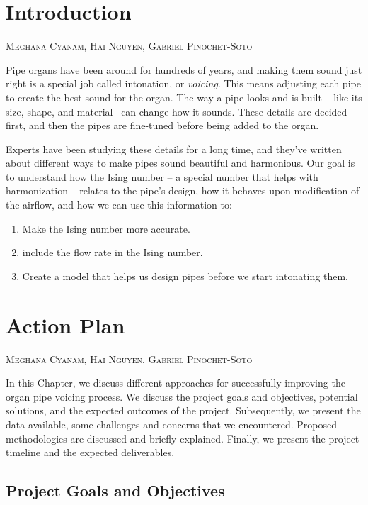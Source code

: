 \documentclass{psu-report}
\newcommand{\chapterauthor}[1]{%
  \vspace{-2em}
  {\large \textsc{#1}\par}
  \vspace{1.5em}
}
\begin{document}

\startbody

\chapter{Introduction}
\chapterauthor{Meghana Cyanam, Hai Nguyen, Gabriel Pinochet-Soto}

Pipe organs have been around for hundreds of years, and making them sound just
right is a special job called intonation, or \emph{voicing}.
This means adjusting each pipe to create the best sound for the organ.
The way a pipe looks and is built -- like its size, shape, and material-- can
change how it sounds.
These details are decided first, and then the pipes are fine-tuned before being
added to the organ.

Experts have been studying these details for a long time, and they’ve written
about different ways to make pipes sound beautiful and harmonious.
Our goal is to understand how the Ising number -- a special number that helps
with harmonization -- relates to the pipe’s design, how it behaves upon modification of
the airflow, and how we can use this information to:
\begin{enumerate}
    \item Make the Ising number more accurate.
    \item include the flow rate in the Ising number.
    \item Create a model that helps us design pipes before we start intonating them.
\end{enumerate}

\chapter{Action Plan}
\chapterauthor{Meghana Cyanam, Hai Nguyen, Gabriel Pinochet-Soto}

In this Chapter, we discuss different approaches for successfully improving the
organ pipe voicing process.
We discuss the project goals and objectives, potential solutions, and the
expected outcomes of the project.
Subsequently, we present the data available, some challenges and concerns that
we encountered.
Proposed methodologies are discussed and briefly explained.
Finally, we present the project timeline and the expected deliverables.

\section{Project Goals and Objectives}
\end{document}
